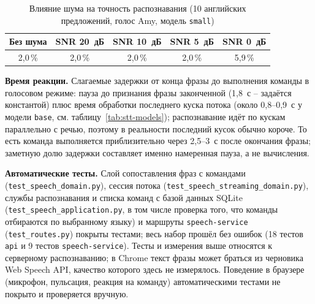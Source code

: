 \begin{table}[H]
  \centering
  \caption{Влияние шума на точность распознавания (10 английских предложений, голос Amy, модель \texttt{small})}
  \label{tab:stt-noise}
  \small
  \begin{tabular}{|c|c|c|c|c|}
    \hline
    Без шума & SNR 20~дБ & SNR 10~дБ & SNR 5~дБ & SNR 0~дБ \\
    \hline
    2{,}0\,\% & 2{,}0\,\% & 2{,}0\,\% & 2{,}0\,\% & 5{,}9\,\% \\
    \hline
  \end{tabular}
\end{table}

\textbf{Время реакции.} Слагаемые задержки от конца фразы до
выполнения команды в голосовом режиме: пауза до признания фразы
законченной (1{,}8~с -- задаётся константой) плюс время обработки
последнего куска потока (около 0{,}8--0{,}9~с у модели \texttt{base}, см.
таблицу~\ref{tab:stt-models}); распознавание идёт по кускам параллельно
с речью, поэтому в реальности последний кусок обычно короче. То
есть команда выполняется приблизительно через 2{,}5--3~с после
окончания фразы; заметную долю задержки составляет именно
намеренная пауза, а не вычисления.

\textbf{Автоматические тесты.} Слой сопоставления фраз с
командами (\texttt{test\_speech\_domain.py}), сессия потока
(\texttt{test\_speech\_streaming\_domain.py}), службы распознавания и
списка команд с базой данных SQLite (\texttt{test\_speech\_application.py},
в том числе проверка того, что команды отбираются по выбранному языку) и
маршруты \texttt{speech-service} (\texttt{test\_routes.py}) покрыты
тестами; весь набор прошёл без ошибок (18 тестов \texttt{api} и 9
тестов \texttt{speech-service}). Тесты и измерения выше относятся к серверному распознаванию; в Chrome текст фразы может браться из черновика Web Speech API, качество которого здесь не измерялось. Поведение в браузере (микрофон,
пульсация, реакция на команду) автоматическими тестами не покрыто и
проверяется вручную.


